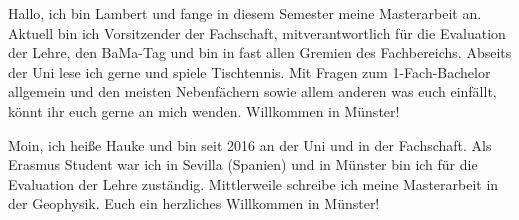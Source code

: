 \begin{multicols}{2}
\small


{
Hallo, ich bin Lambert und fange in diesem Semester meine Masterarbeit an. Aktuell bin ich Vorsitzender der Fachschaft, mitverantwortlich für die Evaluation der Lehre, den BaMa-Tag und bin in fast allen Gremien des Fachbereichs. Abseits der Uni lese ich gerne und spiele Tischtennis. Mit Fragen zum 1-Fach-Bachelor allgemein und den meisten Nebenfächern sowie allem anderen was euch einfällt, könnt ihr euch gerne an mich wenden. Willkommen in Münster! 
}

\vspace{-0.5cm}

{
Moin, ich heiße Hauke und bin seit 2016 an der Uni und in der Fachschaft. Als Erasmus Student war ich in Sevilla (Spanien) und in Münster bin ich für die Evaluation der Lehre zuständig. Mittlerweile schreibe ich meine Masterarbeit in der Geophysik. 
Euch ein herzliches Willkommen in Münster!
}


\end{multicols}
